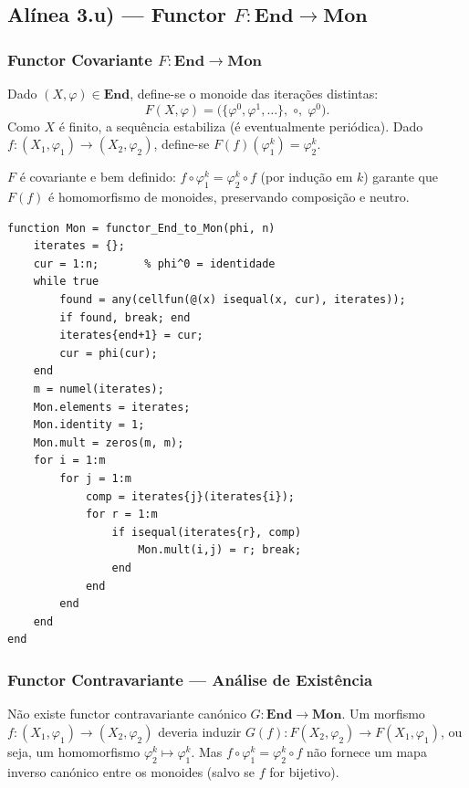 \subsection{Alínea 3.u) --- Functor $F: \mathbf{End} \to \mathbf{Mon}$}
\label{subsec:functor-end-mon}

\subsubsection{Functor Covariante $F: \mathbf{End} \to \mathbf{Mon}$}

\begin{definition}
Dado $(X,\varphi) \in \mathbf{End}$, define-se o monoide das iterações distintas:
\[
    F(X,\varphi) = \bigl(\{\varphi^0, \varphi^1, \ldots\},\;\circ,\;\varphi^0\bigr).
\]
Como $X$ é finito, a sequência estabiliza (é eventualmente periódica). Dado $f: (X_1,\varphi_1) \to (X_2,\varphi_2)$, define-se $F(f)(\varphi_1^k) = \varphi_2^k$.
\end{definition}

\begin{proposition}
$F$ é covariante e bem definido: $f \circ \varphi_1^k = \varphi_2^k \circ f$ (por indução em $k$) garante que $F(f)$ é homomorfismo de monoides, preservando composição e neutro.
\end{proposition}

\begin{lstlisting}[style=matlab, caption={Functor covariante $F: \mathbf{End} \to \mathbf{Mon}$}]
function Mon = functor_End_to_Mon(phi, n)
    iterates = {};
    cur = 1:n;       % phi^0 = identidade
    while true
        found = any(cellfun(@(x) isequal(x, cur), iterates));
        if found, break; end
        iterates{end+1} = cur;
        cur = phi(cur);
    end
    m = numel(iterates);
    Mon.elements = iterates;
    Mon.identity = 1;
    Mon.mult = zeros(m, m);
    for i = 1:m
        for j = 1:m
            comp = iterates{j}(iterates{i});
            for r = 1:m
                if isequal(iterates{r}, comp)
                    Mon.mult(i,j) = r; break;
                end
            end
        end
    end
end
\end{lstlisting}

\subsubsection{Functor Contravariante --- Análise de Existência}

\begin{proposition}
Não existe functor contravariante canónico $G: \mathbf{End} \to \mathbf{Mon}$. Um morfismo $f: (X_1,\varphi_1) \to (X_2,\varphi_2)$ deveria induzir $G(f): F(X_2,\varphi_2) \to F(X_1,\varphi_1)$, ou seja, um homomorfismo $\varphi_2^k \mapsto \varphi_1^k$. Mas $f \circ \varphi_1^k = \varphi_2^k \circ f$ não fornece um mapa inverso canónico entre os monoides (salvo se $f$ for bijetivo).
\end{proposition}

